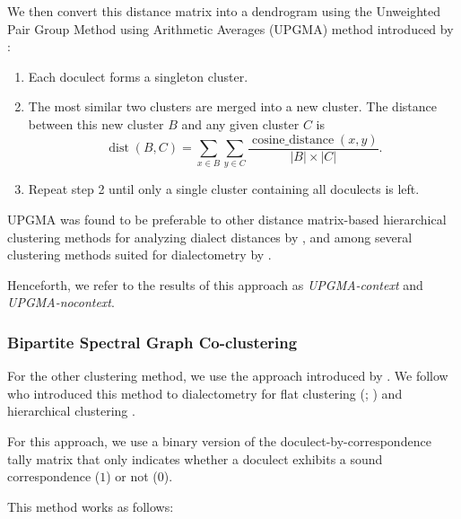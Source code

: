 \documentclass[a4paper]{article}
\begin{document}
We then convert this distance matrix into a dendrogram using the
Unweighted Pair Group Method using Arithmetic Averages
(UPGMA) method introduced by \citet{sokal1958statistical}:

\begin{enumerate}
\item
Each doculect forms a singleton cluster.

\item
The most similar two clusters are merged into a new cluster.
The distance between this new cluster $B$ and any given cluster $C$ is
\begin{equation*}
\operatorname{dist}(B, C) =
\sum_{x \in B}
\sum_{y \in C}
\frac{
\operatorname{cosine\_distance}(x, y)
}
{
|B| \times |C|
}
.
\end{equation*}

\item
Repeat step 2 until only a single cluster containing all doculects is left.
\end{enumerate}

UPGMA was found to be preferable to other
distance matrix-based hierarchical clustering methods
for analyzing dialect distances by \citet[p. 153]{heeringa2004measuring},
and among several clustering methods suited for dialectometry
by \citet{prokic2008recognizing}.

Henceforth, we refer to the results of this approach
as \textit{UPGMA-context} and \textit{UPGMA-nocontext}.

\subsubsection{Bipartite Spectral Graph Co-clustering}
\label{subsubsec:bsgc}

For the other clustering method, we use the approach
introduced by \citet{dhillon2001co-clustering}.
We follow \citeauthor*{wieling2009bipartite} who introduced
this method to dialectometry for flat clustering (\citeyear{wieling2009bipartite}; \citeyear{wieling2011bipartite}) and hierarchical clustering \citeyearpar{wieling2010hierarchical}.

For this approach, we use a binary version of the
doculect-by-correspondence tally matrix that only
indicates whether a doculect exhibits
a sound correspondence ($1$) or not ($0$).

This method works as follows:
\end{document}

